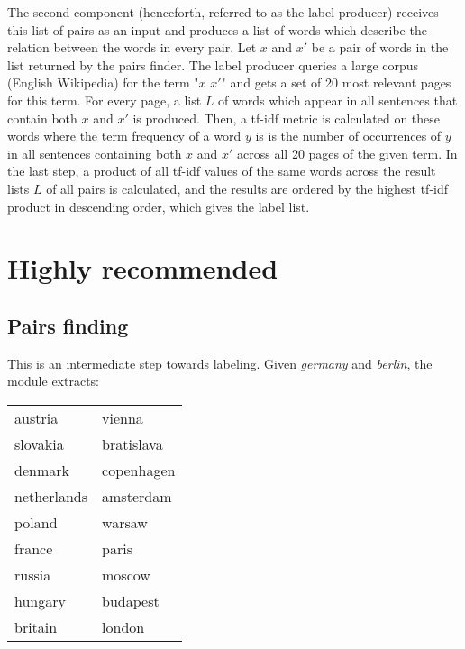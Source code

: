 \documentclass[11pt,a4paper]{article}
\begin{document}
The second component (henceforth, referred to as the label producer) receives this list of pairs as an input and produces a list of words which describe the relation between the words in every pair. Let $x$ and $x'$ be a pair of words in the list returned by the pairs finder. The label producer queries a large corpus (English Wikipedia) for the term "$x$ $x'$" and gets a set of 20 most relevant pages for this term. For every page, a list $L$ of words which appear in all sentences that contain both $x$ and $x'$ is produced. Then, a tf-idf metric is calculated on these words where the term frequency of a word $y$ is is the number of occurrences of $y$ in all sentences containing both $x$ and $x'$ across all 20 pages of the given term. In the last step, a product of all tf-idf values of the same words across the result lists $L$ of all pairs is calculated, and the results are ordered by the highest tf-idf product in descending order, which gives the label list.
\section{Highly recommended}
\subsection{Pairs finding}
This is an intermediate step towards labeling. Given \textit{germany} and \textit{berlin}, the module extracts:
\begin{tabular}{ l l }
  austria & vienna \\
  slovakia & bratislava \\
  denmark & copenhagen \\
  netherlands & amsterdam \\
  poland & warsaw \\
  france & paris \\
  russia & moscow \\
  hungary & budapest \\
  britain & london

\end{tabular}
\end{document}
